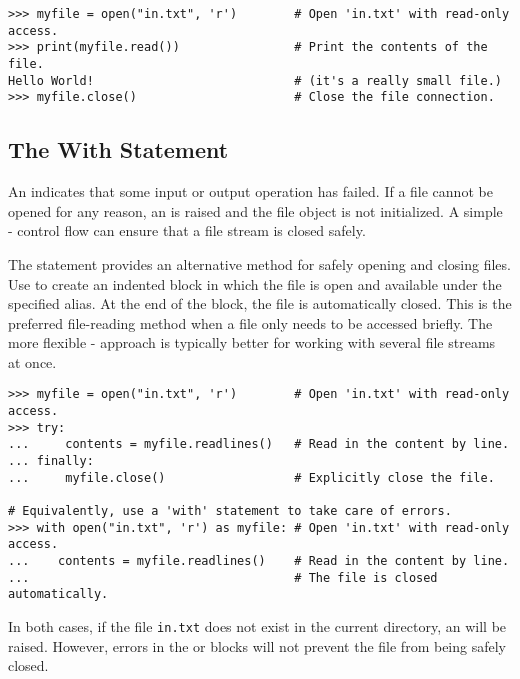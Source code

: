 \begin{lstlisting}
>>> myfile = open("in.txt", 'r')        # Open 'in.txt' with read-only access.
>>> print(myfile.read())                # Print the contents of the file.
Hello World!                            # (it's a really small file.)
>>> myfile.close()                      # Close the file connection.
\end{lstlisting}


\subsection*{The With Statement} %

An  indicates that some input or output operation has failed.
If a file cannot be opened for any reason, an  is raised and the file object is not initialized.
A simple - control flow can ensure that a file stream is closed safely.

The  statement provides an alternative method for safely opening and closing files.
Use  to create an indented block in which the file is open and available under the specified alias.
At the end of the block, the file is automatically closed.
This is the preferred file-reading method when a file only needs to be accessed briefly.
The more flexible - approach is typically better for working with several file streams at once.

\begin{lstlisting}
>>> myfile = open("in.txt", 'r')        # Open 'in.txt' with read-only access.
>>> try:
...     contents = myfile.readlines()   # Read in the content by line.
... finally:
...     myfile.close()                  # Explicitly close the file.

# Equivalently, use a 'with' statement to take care of errors.
>>> with open("in.txt", 'r') as myfile: # Open 'in.txt' with read-only access.
...    contents = myfile.readlines()    # Read in the content by line.
...                                     # The file is closed automatically.
\end{lstlisting}

In both cases, if the file \texttt{in.txt} does not exist in the current directory, an  will be raised.
However, errors in the  or  blocks will not prevent the file from being safely closed.

\newpage

